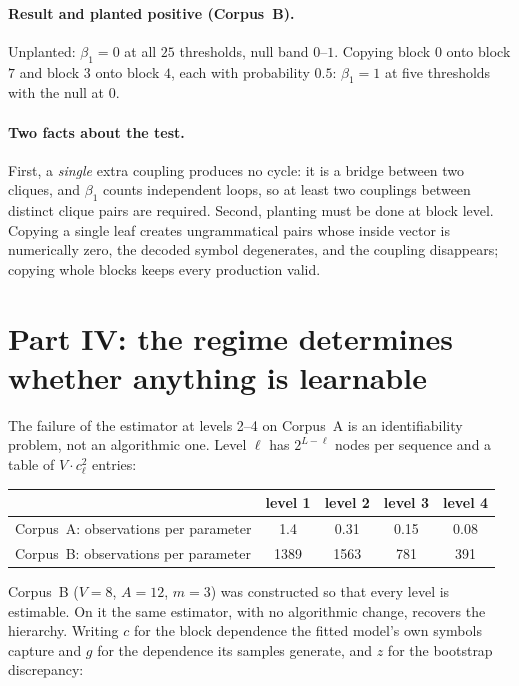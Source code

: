 \paragraph{Result and planted positive (Corpus~B).}
Unplanted: $\beta_1 = 0$ at all $25$ thresholds, null band $0$--$1$. Copying
block $0$ onto block $7$ and block $3$ onto block $4$, each with probability
$0.5$: $\beta_1 = 1$ at five thresholds with the null at $0$.

\paragraph{Two facts about the test.}
First, a \emph{single} extra coupling produces no cycle: it is a bridge between
two cliques, and $\beta_1$ counts independent loops, so at least two couplings
between distinct clique pairs are required. Second, planting must be done at
block level. Copying a single leaf creates ungrammatical pairs whose inside
vector is numerically zero, the decoded symbol degenerates, and the coupling
disappears; copying whole blocks keeps every production valid.


\section{Part IV: the regime determines whether anything is learnable}
\label{sec:hier-regime}

The failure of the estimator at levels 2--4 on Corpus~A is an identifiability
problem, not an algorithmic one. Level $\ell$ has $2^{L-\ell}$ nodes per
sequence and a table of $V\cdot c_\ell^2$ entries:

\begin{center}
\begin{tabular}{lcccc}
\toprule
 & level 1 & level 2 & level 3 & level 4 \\
\midrule
Corpus~A: observations per parameter & 1.4 & 0.31 & 0.15 & 0.08 \\
Corpus~B: observations per parameter & 1389 & 1563 & 781 & 391 \\
\bottomrule
\end{tabular}
\end{center}

\noindent
Corpus~B ($V=8$, $A=12$, $m=3$) was constructed so that every level is
estimable. On it the same estimator, with no algorithmic change, recovers the
hierarchy. Writing $c$ for the block dependence the fitted model's own symbols
capture and $g$ for the dependence its samples generate, and $z$ for the
bootstrap discrepancy:

